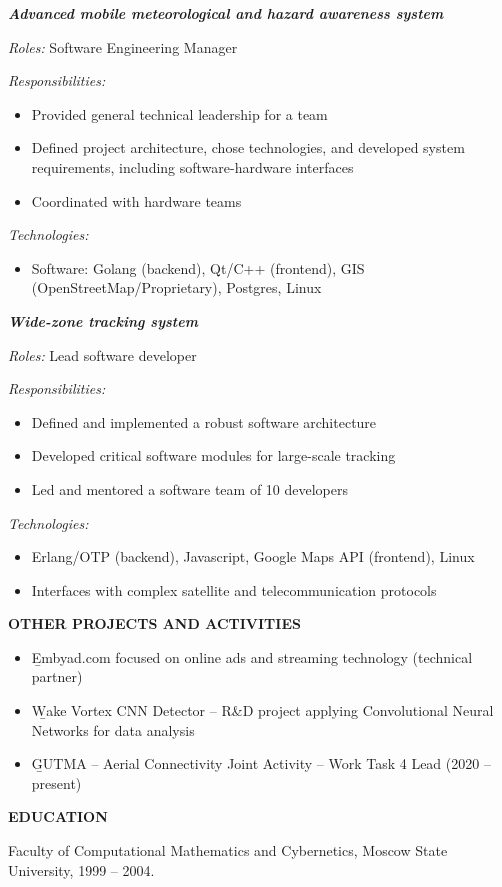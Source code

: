 \documentclass[a4paper]{article}
\newcommand{\project}[4]{

	\textbf{\textit{#1}}
    \vspace{2mm}

    \textit{Roles:} #2
    \vspace{2mm}

    \textit{Responsibilities:}
	\begin{itemize}
	    \setlength{\itemindent}{.5cm}
	    #3
    \end{itemize}
    
	\textit{Technologies:}
	\begin{itemize}
		\setlength{\itemindent}{.5cm}
		#4
	\end{itemize}
}
\begin{document}
    \vspace{2mm}

	\project{Advanced mobile meteorological and hazard awareness system}{
		Software Engineering Manager
	}{
		\item Provided general technical leadership for a team
		\item Defined project architecture, chose technologies, and developed system requirements, including software-hardware interfaces
		\item Coordinated with hardware teams
	}{
		\item Software: Golang (backend), Qt/C++ (frontend), GIS (OpenStreetMap/Proprietary), Postgres, Linux
	}
    \vspace{2mm}

	\project{Wide-zone tracking system}{
		Lead software developer
	}{
		\item Defined and implemented a robust software architecture
		\item Developed critical software modules for large-scale tracking
		\item Led and mentored a software team of 10 developers
	}{
		\item Erlang/OTP (backend), Javascript, Google Maps API (frontend), Linux
		\item Interfaces with complex satellite and telecommunication protocols 
	}
    
    \vspace{3mm}
    \textbf{OTHER PROJECTS AND ACTIVITIES}
    \vspace{3mm}

	\begin{itemize}
	    \setlength{\itemindent}{.5cm}	
	    \item {\b Embyad.com} focused on online ads and streaming technology (technical partner)
        \item {\b Wake Vortex CNN Detector} -- R\&D project applying Convolutional Neural Networks for data analysis
	    \item {\b GUTMA} -- Aerial Connectivity Joint Activity -- Work Task 4 Lead (2020 -- present)
    \end{itemize}
    \vspace{3mm}
    
    \textbf{EDUCATION}
    \vspace{3mm}
    
    Faculty of Computational Mathematics and Cybernetics, Moscow State University, 1999 -- 2004.
    \vspace{5mm}
    
\end{document}
